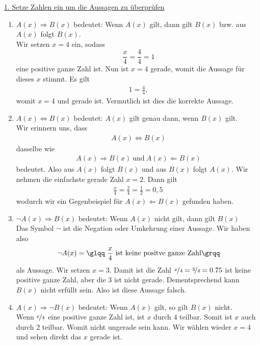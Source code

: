 \underline{1. Setze Zahlen ein um die Aussagen zu überprüfen}
\renewcommand{\labelenumi}{(\alph{enumi})}
\begin{enumerate}
\item $A(x) \Rightarrow B(x)$ bedeutet:
Wenn $A(x)$ gilt, dann gilt $B(x)$ bzw. aus $A(x)$ folgt $B(x)$.\\
Wir setzen $x=4$ ein, sodass
\begin{equation}
\frac{x}{4}= \frac{4}{4} = 1
\end{equation}
eine positive ganze Zahl ist.
Nun ist $x=4$ gerade, womit die Aussage für dieses $x$ stimmt.
Es gilt
\begin{align*}
1 = \frac{4}{4},
\end{align*}
womit $x = 4 $ und gerade ist.
Vermutlich ist dies die korrekte Aussage.
\item $A(x) \Leftrightarrow B(x)$ bedeutet:
$A(x)$ gilt genau dann, wenn $B(x)$ gilt.\\
Wir erinnern uns, dass
\begin{align*}
A(x) \Leftrightarrow B(x)
\end{align*}
dasselbe wie 
\begin{align*}
A(x) \Rightarrow B(x) \ \text{und} \ A(x) \Leftarrow B(x)
\end{align*}
bedeutet. Also aus $A(x)$ folgt $B(x)$ und aus $B(x)$ folgt $A(x)$.
Wir nehmen die einfachste gerade Zahl $x = 2 $.
Dann gilt 
\begin{align*}
\frac{x}{4} = \frac{2}{4} = \frac{1}{2} = 0,5 \,
\end{align*}
wodurch wir ein Gegenbeispiel für $A(x) \Leftarrow B(x)$ gefunden haben.
\item $\neg A(x) \Rightarrow B(x)$ bedeutet:
Wenn $A(x)$ nicht gilt, dann gilt $B(x)$\\
Das Symbol $\neg$ ist die Negation oder Umkehrung einer Aussage.
Wir haben also 
\begin{align*}
\neg A(x) = \text{\glqq $\frac{x}{4}$ ist keine positve ganze Zahl\grqq}
\end{align*}
als Aussage.
Wir setzen $x= 3$.
Damit ist die Zahl $\nicefrac{x}{4} = \nicefrac{3}{4} = 0.75$ ist keine positive ganze Zahl, aber die $3$ ist nicht gerade.
Dementsprechend kann $B(x)$ nicht erfüllt sein.
Also ist diese Aussage falsch.
\item $A(x) \Rightarrow \neg B(x)$ bedeutet:
Wenn $A(x)$ gilt, so gilt $B(x)$ nicht.\\
Wenn $\nicefrac{x}{4}$ eine positive ganze Zahl ist, ist $x$ durch $4$ teilbar.
Somit ist $x$ auch durch $2$ teilbar.
Womit nicht ungerade sein kann.
Wir wählen wieder $x= 4$ und sehen direkt das $x$ gerade ist.
\end{enumerate}
